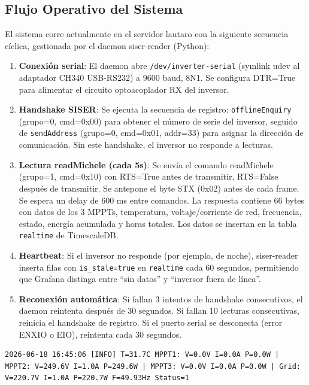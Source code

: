 \documentclass[12pt,a4paper]{article}
\begin{document}
\subsection{Flujo Operativo del Sistema}

El sistema corre actualmente en el servidor lautaro con la siguiente secuencia c\'iclica, gestionada por el daemon siser-reader (Python):

\begin{enumerate}
    \item \textbf{Conexi\'on serial}: El daemon abre \texttt{/dev/inverter-serial} (symlink udev al adaptador CH340 USB-RS232) a 9600 baud, 8N1. Se configura DTR=True para alimentar el circuito optoacoplador RX del inversor.
    \item \textbf{Handshake SISER}: Se ejecuta la secuencia de registro: \texttt{offlineEnquiry} (grupo=0, cmd=0x00) para obtener el n\'umero de serie del inversor, seguido de \texttt{sendAddress} (grupo=0, cmd=0x01, addr=33) para asignar la direcci\'on de comunicaci\'on. Sin este handshake, el inversor no responde a lecturas.
    \item \textbf{Lectura readMichele (cada 5s)}: Se env\'ia el comando readMichele (grupo=1, cmd=0x10) con RTS=True antes de transmitir, RTS=False despu\'es de transmitir. Se antepone el byte STX (0x02) antes de cada frame. Se espera un delay de 600 ms entre comandos. La respuesta contiene 66 bytes con datos de los 3 MPPTs, temperatura, voltaje/corriente de red, frecuencia, estado, energ\'ia acumulada y horas totales. Los datos se insertan en la tabla \texttt{realtime} de TimescaleDB.
    \item \textbf{Heartbeat}: Si el inversor no responde (por ejemplo, de noche), siser-reader inserta filas con \texttt{is\_stale=true} en \texttt{realtime} cada 60 segundos, permitiendo que Grafana distinga entre ``sin datos'' y ``inversor fuera de l\'inea''.
    \item \textbf{Reconexi\'on autom\'atica}: Si fallan 3 intentos de handshake consecutivos, el daemon reintenta despu\'es de 30 segundos. Si fallan 10 lecturas consecutivas, reinicia el handshake de registro. Si el puerto serial se desconecta (error ENXIO o EIO), reintenta cada 30 segundos.
\end{enumerate}

\begin{lstlisting}[caption={Salida t\'ipica del daemon siser-reader en producci\'on}]
2026-06-18 16:45:06 [INFO] T=31.7C MPPT1: V=0.0V I=0.0A P=0.0W | MPPT2: V=249.6V I=1.0A P=249.6W | MPPT3: V=0.0V I=0.0A P=0.0W | Grid: V=220.7V I=1.0A P=220.7W F=49.93Hz Status=1
\end{lstlisting}
\end{document}
